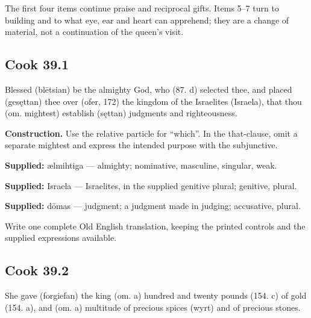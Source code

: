 The first four items continue praise and reciprocal gifts. Items 5–7 turn to building and to what eye, ear and heart can apprehend; they are a change of material, not a continuation of the queen’s visit.

\par\begin{minipage}{\linewidth}\raggedright
\subsection*{Cook 39.1}

Blessed (blētsian) be the almighty God, who (87. d) selected thee, and placed (gesęttan) thee over (ofer, 172) the kingdom of the Israelites (Israela), that thou (om. mightest) establish (sęttan) judgments and righteousness.

\textbf{Construction.} Use the relative particle for “which”. In the that-clause, omit a separate mightest and express the intended purpose with the subjunctive.

\end{minipage}\par\addvspace{4pt}

\textbf{Supplied:} ælmihtiga — almighty; nominative, masculine, singular, weak.

\textbf{Supplied:} Israela — Israelites, in the supplied genitive plural; genitive, plural.

\textbf{Supplied:} dōmas — judgment; a judgment made in judging; accusative, plural.

Write one complete Old English translation, keeping the printed controls and the supplied expressions available.

\par\begin{minipage}{\linewidth}\raggedright
\subsection*{Cook 39.2}

She gave (forgiefan) the king (om. a) hundred and twenty pounds (154. c) of gold (154. a), and (om. a) multitude of precious spices (wyrt) and of precious stones.

\end{minipage}\par\addvspace{4pt}

